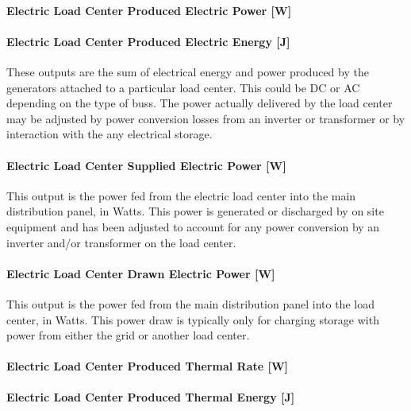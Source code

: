 \paragraph{Electric Load Center Produced Electric Power {[}W{]}}\label{electric-load-center-produced-electric-power-w}

\paragraph{Electric Load Center Produced Electric Energy {[}J{]}}\label{electric-load-center-produced-electric-energy-j}

These outputs are the sum of electrical energy and power produced by the generators attached to a particular load center. This could be DC or AC depending on the type of buss. The power actually delivered by the load center may be adjusted by power conversion losses from an inverter or transformer or by interaction with the any electrical storage.

\paragraph{Electric Load Center Supplied Electric Power {[}W{]}}\label{electric-load-center-supplied-electric-power-w}

This output is the power fed from the electric load center into the main distribution panel, in Watts. This power is generated or discharged by on site equipment and has been adjusted to account for any power conversion by an inverter and/or transformer on the load center.

\paragraph{Electric Load Center Drawn Electric Power {[}W{]}}\label{electric-load-center-drawn-electric-power-w}

This output is the power fed from the main distribution panel into the load center, in Watts. This power draw is typically only for charging storage with power from either the grid or another load center.

\paragraph{Electric Load Center Produced Thermal Rate {[}W{]}}\label{electric-load-center-produced-thermal-rate-w}

\paragraph{Electric Load Center Produced Thermal Energy {[}J{]}}\label{electric-load-center-produced-thermal-energy-j}


